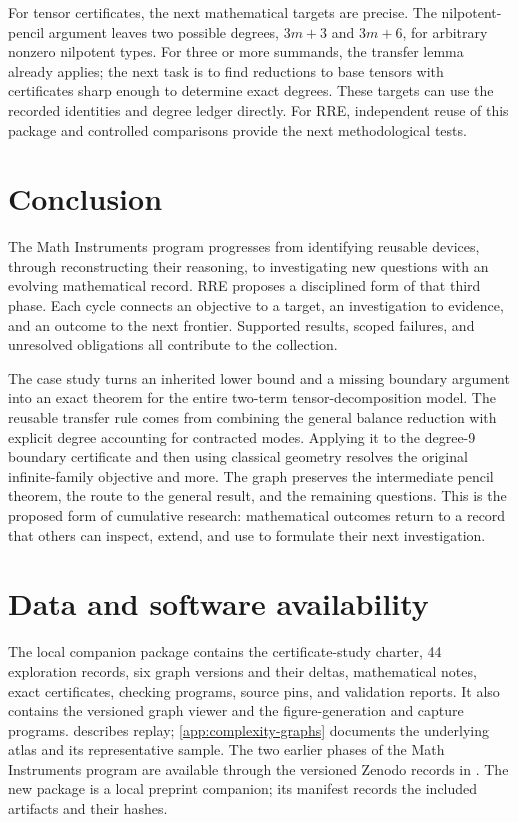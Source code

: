 For tensor certificates, the next mathematical targets are precise. The nilpotent-pencil argument leaves two possible degrees, $3m+3$ and $3m+6$, for arbitrary nonzero nilpotent types. For three or more summands, the transfer lemma already applies; the next task is to find reductions to base tensors with certificates sharp enough to determine exact degrees. These targets can use the recorded identities and degree ledger directly. For RRE, independent reuse of this package and controlled comparisons provide the next methodological tests.

\section{Conclusion}

The Math Instruments program progresses from identifying reusable devices, through reconstructing their reasoning, to investigating new questions with an evolving mathematical record. RRE proposes a disciplined form of that third phase. Each cycle connects an objective to a target, an investigation to evidence, and an outcome to the next frontier. Supported results, scoped failures, and unresolved obligations all contribute to the collection.

The case study turns an inherited lower bound and a missing boundary argument into an exact theorem for the entire two-term tensor-decomposition model. The reusable transfer rule comes from combining the general balance reduction with explicit degree accounting for contracted modes. Applying it to the degree-9 boundary certificate and then using classical geometry resolves the original infinite-family objective and more. The graph preserves the intermediate pencil theorem, the route to the general result, and the remaining questions. This is the proposed form of cumulative research: mathematical outcomes return to a record that others can inspect, extend, and use to formulate their next investigation.

\section*{Data and software availability}
The local companion package contains the certificate-study charter, 44 exploration records, six graph versions and their deltas, mathematical notes, exact certificates, checking programs, source pins, and validation reports. It also contains the versioned graph viewer and the figure-generation and capture programs.  describes replay; \cref{app:complexity-graphs} documents the underlying atlas and its representative sample. The two earlier phases of the Math Instruments program are available through the versioned Zenodo records in \cite{xie1,xie2}. The new package is a local preprint companion; its manifest records the included artifacts and their hashes.


